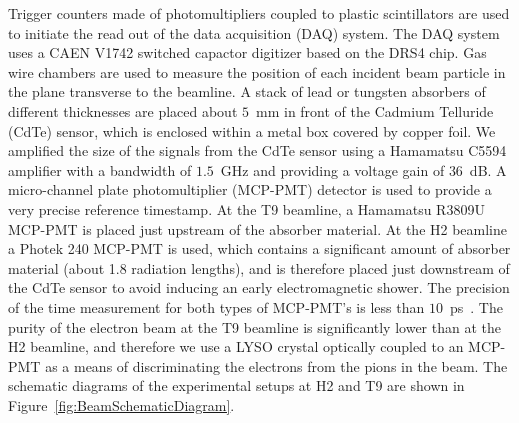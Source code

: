\documentclass[preprint,1p]{elsarticle}
\begin{document}
Trigger counters made of photomultipliers coupled to plastic scintillators are used 
to initiate the read out of the data acquisition (DAQ) system. The DAQ system
uses a CAEN V1742 switched capactor digitizer based on the DRS4 chip. Gas wire chambers
are used to measure the position of each incident beam particle in the plane transverse
to the beamline. A stack of lead or tungsten absorbers of different thicknesses are 
placed about $5$~mm in front of the Cadmium Telluride (CdTe) sensor, which is 
enclosed within a metal box covered by copper foil. We amplified the size of the
signals from the CdTe sensor using a Hamamatsu C5594 amplifier with a bandwidth of
$1.5$~GHz and providing a voltage gain of $36$~dB. A micro-channel plate photomultiplier (MCP-PMT)
detector is used to provide a very precise reference timestamp. At the T9 beamline,
a Hamamatsu R3809U MCP-PMT is placed just upstream of the absorber material. 
At the H2 beamline a Photek 240 MCP-PMT is used, which contains a significant 
amount of absorber material (about 1.8 radiation lengths), and is therefore placed 
just downstream of the CdTe sensor to avoid inducing an early electromagnetic shower.
The precision of the time measurement for both types of MCP-PMT's is less than 
$10$~ps~\cite{Ronzhin2015288}. The purity of the electron beam at the T9 beamline is
significantly lower than at the H2 beamline, and therefore we use a LYSO crystal
optically coupled to an MCP-PMT as a means of discriminating the electrons from the pions
in the beam. The schematic diagrams of the experimental setups at H2 and T9 
are shown in Figure~\ref{fig:BeamSchematicDiagram}. 
\end{document}
